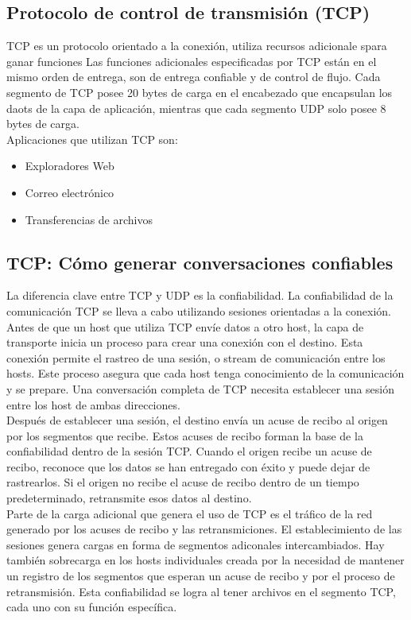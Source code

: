 \documentclass[12pt]{report}
\begin{document}
        \subsection{Protocolo de control de transmisión (TCP)}
        TCP es un protocolo orientado a la conexión, utiliza recursos adicionale spara ganar funciones
        Las funciones adicionales especificadas por TCP están en el mismo orden de entrega, son de entrega confiable y de control de flujo.
        Cada segmento de TCP posee 20 bytes de carga en el encabezado que encapsulan los daots de la capa de aplicación, mientras que cada segmento UDP solo posee 8 bytes de carga.
        \\Aplicaciones que utilizan TCP son: 
        \begin{itemize}
            \item Exploradores Web
            \item Correo electrónico
            \item Transferencias de archivos
        \end{itemize}
        \subsection*{TCP: Cómo generar conversaciones confiables}
        La diferencia clave entre TCP y UDP es la confiabilidad. La confiabilidad de la comunicación TCP se lleva a cabo utilizando sesiones orientadas a la conexión.
        Antes de que un host que utiliza TCP envíe datos a otro host, la capa de transporte inicia un proceso para crear una conexión con el destino.
        Esta conexión permite el rastreo de una sesión, o stream de comunicación entre los hosts.
        Este proceso asegura que cada host tenga conocimiento de la comunicación y se prepare.
        Una conversación completa de TCP necesita establecer una sesión entre los host de ambas direcciones.
        \\Después de establecer una sesión, el destino envía un acuse de recibo al origen por los segmentos que recibe.
        Estos acuses de recibo forman la base de la confiabilidad dentro de la sesión TCP.
        Cuando el origen recibe un acuse de recibo, reconoce que los datos se han entregado con éxito y puede dejar de rastrearlos.
        Si el origen no recibe el acuse de recibo dentro de un tiempo predeterminado, retransmite esos datos al destino.
        \\Parte de la carga adicional que genera el uso de TCP es el tráfico de la red generado por los acuses de recibo y las retransmiciones.
        El establecimiento de las sesiones genera cargas en forma de segmentos adiconales intercambiados.
        Hay también sobrecarga en los hosts individuales creada por la necesidad de mantener un registro de los segmentos que esperan un acuse de recibo y por el proceso de retransmisión.
        Esta confiabilidad se logra al tener archivos en el segmento TCP, cada uno con su función específica.
\end{document}
